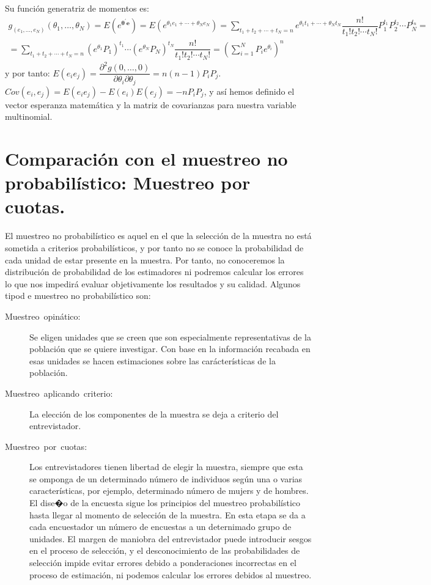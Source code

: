 Su funci\'on generatriz de momentos es:
\[
\begin{array}{c}
g_{\left(e_{1},\ldots,e_{N}\right)}\left(\theta_{1},\ldots,\theta_{N}\right)=E\left(e^{\boldsymbol{\theta}^{\prime}\boldsymbol{e}}\right)=E\left(e^{\theta_{1}e_{1}+\cdots+\theta_{N}e_{N}}\right)=\sum_{t_{1}+t_{2}+\cdots+t_{N}=n}e^{\theta_{1}t_{1}+\cdots+\theta_{N}t_{N}}\dfrac{n!}{t_{1}!t_{2}!\cdots t_{N}!}P_{1}^{t_{1}}P_{2}^{t_{2}}\cdots P_{N}^{t_{n}}=\\
=\sum_{t_{1}+t_{2}+\cdots+t_{N}=n}\left(e^{\theta_{1}}P_{1}\right)^{t_{1}}\cdots\left(e^{\theta_{N}}P_{N}\right)^{t_{N}}\dfrac{n!}{t_{1}!t_{2}!\cdots t_{N}!}=\left(\sum_{i=1}^{N}P_{i}e^{\theta_{i}}\right)^{n}
\end{array}
\]
 y por tanto: $E\left(e_{i}e_{j}\right)=\dfrac{\partial^{2}g\left(0,\ldots,0\right)}{\partial\theta_{i}\partial\theta_{j}}=n\left(n-1\right)P_{i}P_{j}$.
$Cov\left(e_{i},e_{j}\right)=E\left(e_{i}e_{j}\right)-E\left(e_{i}\right)E\left(e_{j}\right)=-nP_{i}P_{j}$,
y as\'i hemos definido el vector esperanza matem\'atica y la matriz de
covarianzas para nuestra variable multinomial.


\section{Comparaci\'on con el muestreo no probabil\'istico: Muestreo por cuotas.}

El muestreo no probabil\'istico es aquel en el que la selecci\'on de la
muestra no est\'a sometida a criterios probabil\'isticos, y por tanto
no se conoce la probabilidad de cada unidad de estar presente en la
muestra. Por tanto, no conoceremos la distribuci\'on de probabilidad
de los estimadores ni podremos calcular los errores lo que nos impedir\'a
evaluar objetivamente los resultados y su calidad. Algunos tipod e
muestreo no probabil\'istico son:
\begin{description}
\item [{Muestreo~opin\'atico:}] Se eligen unidades que se creen que son
especialmente representativas de la poblaci\'on que se quiere investigar.
Con base en la informaci\'on recabada en esas unidades se hacen estimaciones
sobre las car\'acter\'isticas de la poblaci\'on.
\item [{Muestreo~aplicando~criterio:}] La elecci\'on de los componentes
de la muestra se deja a criterio del entrevistador.
\item [{Muestreo~por~cuotas:}] Los entrevistadores tienen libertad de
elegir la muestra, siempre que esta se omponga de un determinado n\'umero
de individuos seg\'un una o varias caracter\'isticas, por ejemplo, determinado
n\'umero de mujers y de hombres. El dise�o de la encuesta sigue los
principios del muestreo probabil\'istico hasta llegar al momento de
selecci\'on de la muestra. En esta etapa se da a cada encuestador un
n\'umero de encuestas a un deternimado grupo de unidades. El margen
de maniobra del entrevistador puede introducir sesgos en el proceso
de selecci\'on, y el desconocimiento de las probabilidades de selecci\'on
impide evitar errores debido a ponderaciones incorrectas en el proceso
de estimaci\'on, ni podemos calcular los errores debidos al muestreo.%
\end{description}


